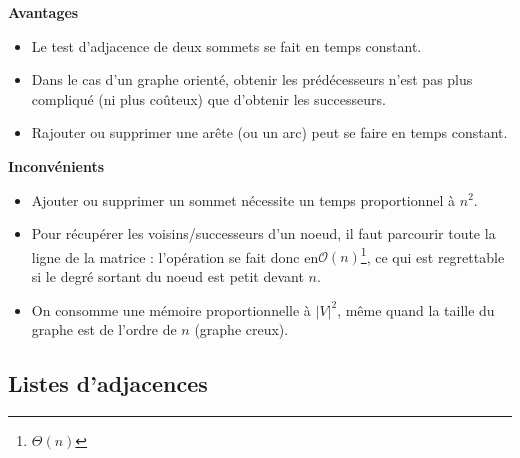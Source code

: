 \begin{minipage}[t]{.47\linewidth}
\begin{center}
\textbf{Avantages}
\end{center}
\begin{itemize}
\item Le test d’adjacence de deux sommets se fait en temps constant.
\item Dans le cas d’un graphe orienté, obtenir les prédécesseurs n’est pas plus compliqué (ni plus coûteux)
que d’obtenir les successeurs.
\item Rajouter ou supprimer une arête (ou un arc) peut se faire en temps constant.
\end{itemize}
\end{minipage}
\hfill
\begin{minipage}[t]{.47\linewidth}
\begin{center}
\textbf{Inconvénients}
\begin{itemize}
\item Ajouter ou supprimer un sommet nécessite un temps proportionnel à $n^2$.
\item Pour récupérer les voisins/successeurs d’un noeud, il faut parcourir toute la ligne de la matrice :
l’opération se fait donc en$\mathcal{O}(n)$\footnote{$\Theta(n)$}, ce qui est regrettable si le degré sortant du noeud est petit devant $n$.
\item On consomme une mémoire proportionnelle à $|V|^2$, même quand la taille du graphe est de l’ordre de $n$ (graphe creux).
\end{itemize}
\end{center}
\end{minipage}

\subsection{Listes d'adjacences}

